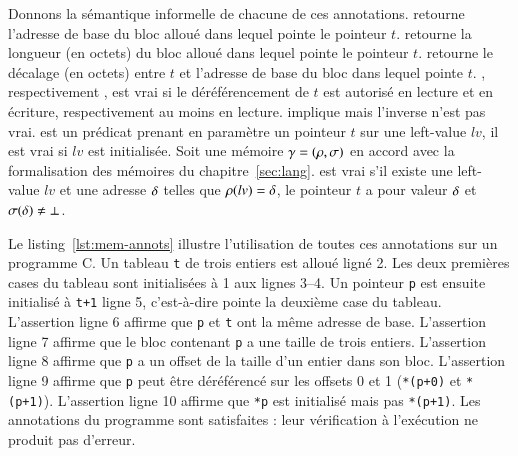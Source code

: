 Donnons la sémantique informelle de chacune de ces annotations.
\baseaddrt retourne l'adresse de base du bloc alloué dans lequel pointe le
pointeur $t$.
\blocklengtht retourne la longueur (en octets) du bloc alloué dans lequel
pointe le pointeur $t$.
\offsett retourne le décalage (en octets) entre $t$ et l'adresse de
base du bloc dans lequel pointe $t$.
\validt, respectivement \validreadt, est vrai si le déréférencement de
$t$ est autorisé en lecture et en écriture, respectivement au moins en
lecture.
\validt implique \validreadt mais l'inverse n'est pas vrai.
\initializedt est un prédicat prenant en paramètre un pointeur $t$ sur une
left-value $lv$, il est vrai si $lv$ est initialisée.
Soit une mémoire $\gamma = (\rho, \sigma)$ en accord avec la formalisation des
mémoires du chapitre~\ref{sec:lang}.
\initializedt est vrai s'il existe une left-value $lv$ et une adresse $\delta$
telles que $\rho(lv) = \delta$, le pointeur $t$ a pour valeur $\delta$ et
$\sigma(\delta) \neq \bot$.




\begin{figure}[h!]

\end{figure}


Le listing~\ref{lst:mem-annots} illustre l'utilisation de toutes ces annotations
sur un programme C.
Un tableau \lstinline't' de trois entiers est alloué ligné 2.
Les deux premières cases du tableau sont initialisées à 1 aux lignes 3--4.
Un pointeur \lstinline'p' est ensuite initialisé à \lstinline't+1' ligne 5,
c'est-à-dire pointe la deuxième case du tableau.
L'assertion ligne 6 affirme que \lstinline'p' et \lstinline't' ont la même
adresse de base.
L'assertion ligne 7 affirme que le bloc contenant \lstinline'p' a une taille de
trois entiers.
L'assertion ligne 8 affirme que \lstinline'p' a un offset de la taille d'un
entier dans son bloc.
L'assertion ligne 9 affirme que \lstinline'p' peut être déréférencé sur les
offsets 0 et 1 (\lstinline'*(p+0)' et \lstinline'*(p+1)').
L'assertion ligne 10 affirme que \lstinline'*p' est initialisé mais pas
\lstinline'*(p+1)'.
Les annotations du programme sont satisfaites : leur vérification à l'exécution
ne produit pas d'erreur.

